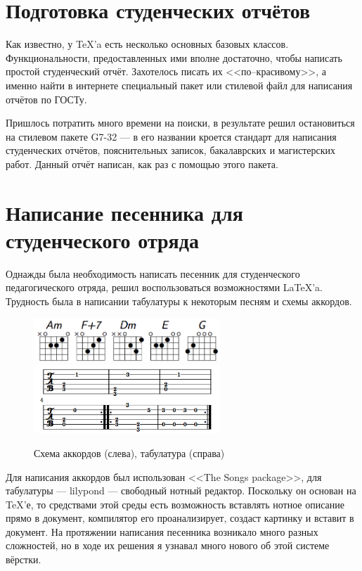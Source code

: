 \documentclass[utf8x, 12pt]{G7-32}
\begin{document}
\section{Подготовка студенческих отчётов}

Как известно, у \TeX 'a есть несколько основных базовых классов. Функциональности, предоставленных ими вполне достаточно, чтобы написать простой студенческий отчёт. Захотелось писать их <<по--красивому>>, а именно найти в интернете специальный пакет или стилевой файл для написания отчётов по ГОСТу. 

Пришлось потратить много времени на поиски, в результате решил остановиться на стилевом пакете G7-32 --- в его названии кроется стандарт для написания студенческих отчётов, пояснительных записок, бакалаврских и магистерских работ. Данный отчёт написан, как раз с помощью этого пакета.

\section{Написание песенника для студенческого отряда}

Однажды была необходимость написать песенник для студенческого педагогического отряда, решил воспользоваться возможностями \LaTeX 'a. Трудность была в написании табулатуры к некоторым песням и схемы аккордов.

\begin{figure}[h]
	\begin{center}
		\includegraphics[width=7.0cm]{img/akk}
		\includegraphics[width=7.0cm]{img/tab}
	\end{center}
	\vspace{-5mm}\caption{Схема аккордов (слева), табулатура (справа)}
\end{figure}	

Для написания аккордов был использован <<The Songs package>>, для табулатуры --- lilypond --- свободный нотный редактор. Поскольку он основан на \TeX 'е, то средствами этой среды есть возможность вставлять нотное описание прямо в документ, компилятор его проанализирует, создаст картинку и вставит в документ. На протяжении написания песенника возникало много разных сложностей, но в ходе их решения я узнавал много нового об этой системе вёрстки.
\end{document}
